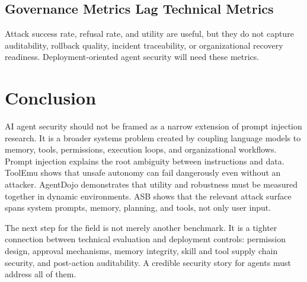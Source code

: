 \documentclass[conference]{IEEEtran}
\begin{document}
\subsection{Governance Metrics Lag Technical Metrics}

Attack success rate, refusal rate, and utility are useful, but they do not capture auditability, rollback quality, incident traceability, or organizational recovery readiness. Deployment-oriented agent security will need these metrics.

\section{Conclusion}

AI agent security should not be framed as a narrow extension of prompt injection research. It is a broader systems problem created by coupling language models to memory, tools, permissions, execution loops, and organizational workflows. Prompt injection explains the root ambiguity between instructions and data. ToolEmu shows that unsafe autonomy can fail dangerously even without an attacker. AgentDojo demonstrates that utility and robustness must be measured together in dynamic environments. ASB shows that the relevant attack surface spans system prompts, memory, planning, and tools, not only user input.

The next step for the field is not merely another benchmark. It is a tighter connection between technical evaluation and deployment controls: permission design, approval mechanisms, memory integrity, skill and tool supply chain security, and post-action auditability. A credible security story for agents must address all of them.
\end{document}
